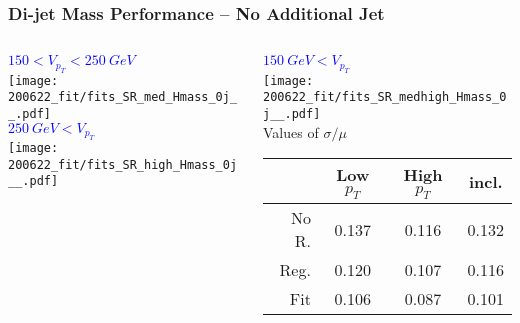 \documentclass{beamer}
\begin{document}
\begin{frame}
  \frametitle{Di-jet Mass Performance -- No Additional Jet}

  \begin{columns}
    \begin{column}{0.5\linewidth}
      \centering
      \textcolor{blue}{$150 < V_{p_T} < \SI{250}{GeV}$} \\
      \texttt{[image: 200622\_fit/fits\_SR\_med\_Hmass\_0j\_\_.pdf]} \\
      \textcolor{blue}{$\SI{250}{GeV} < V_{p_T}$} \\
      \texttt{[image: 200622\_fit/fits\_SR\_high\_Hmass\_0j\_\_.pdf]}
    \end{column}
    \begin{column}{0.5\linewidth}
      \centering
      \textcolor{blue}{$\SI{150}{GeV} < V_{p_T}$} \\
      \texttt{[image: 200622\_fit/fits\_SR\_medhigh\_Hmass\_0j\_\_.pdf]} \\

      Values of $\sigma/\mu$
      {\scriptsize
      \begin{tabular}{|r|c|c|c|}
        \hline
        & Low $p_T$ & High $p_T$ & incl. \\
        \hline
        No R. & 0.137 & 0.116 & 0.132 \\
        Reg.  & 0.120 & 0.107 & 0.116 \\
        Fit   & 0.106 & 0.087 & 0.101 \\
        \hline
      \end{tabular}
      }
    \end{column}
  \end{columns}

\end{frame}
\end{document}
